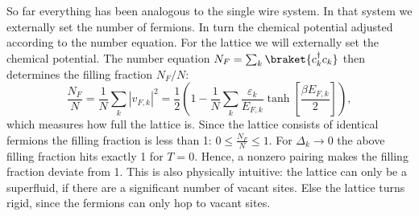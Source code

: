 So far everything has been analogous to the single wire system. In that system we externally set the number of fermions. In turn the chemical potential adjusted according to the number equation. For the lattice we will externally set the chemical potential. The number equation $N_F = \sum_k \braket{c^\dagger_k c_k}$ then determines the filling fraction $N_F / N$:
\begin{equation}
\frac{N_F}{N} = \frac{1}{N}\sum_k |v_{F,k}|^2 = \frac{1}{2}\left(1 - \frac{1}{N}\sum_k \frac{\varepsilon_k}{E_{F,k}}\tanh\left[\frac{\beta E_{F,k}}{2} \right] \right), 
\label{eq.fillingfraction.lattice}
\end{equation}
which measures how full the lattice is. Since the lattice consists of identical fermions the filling fraction is less than 1: $0 \leq \frac{N_F}{N} \leq 1$. For $\Delta_k \to 0$ the above filling fraction hits exactly 1 for $T = 0$. Hence, a nonzero pairing makes the filling fraction deviate from 1. This is also physically intuitive: the lattice can only be a superfluid, if there are a significant number of vacant sites. Else the lattice turns rigid, since the fermions can only hop to vacant sites. 



